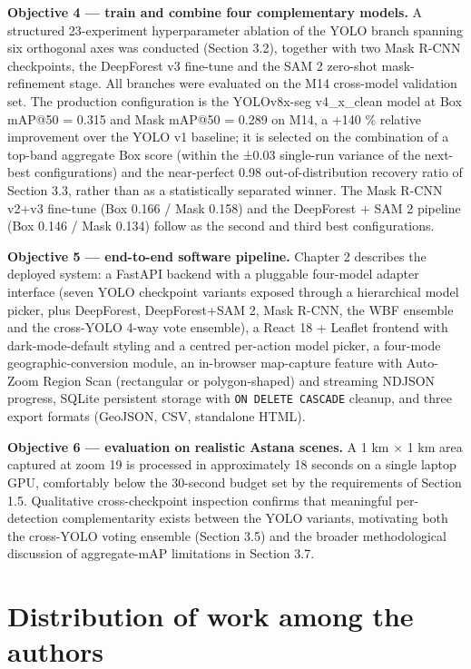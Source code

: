 \textbf{Objective 4 --- train and combine four complementary models.} A structured 23-experiment hyperparameter ablation of the YOLO branch spanning six orthogonal axes was conducted (Section 3.2), together with two Mask R-CNN checkpoints, the DeepForest v3 fine-tune and the SAM 2 zero-shot mask-refinement stage. All branches were evaluated on the M14 cross-model validation set. The production configuration is the YOLOv8x-seg v4\_x\_clean model at Box mAP@50 = 0.315 and Mask mAP@50 = 0.289 on M14, a +140 \% relative improvement over the YOLO v1 baseline; it is selected on the combination of a top-band aggregate Box score (within the ±0.03 single-run variance of the next-best configurations) and the near-perfect 0.98 out-of-distribution recovery ratio of Section 3.3, rather than as a statistically separated winner. The Mask R-CNN v2+v3 fine-tune (Box 0.166 / Mask 0.158) and the DeepForest + SAM 2 pipeline (Box 0.146 / Mask 0.134) follow as the second and third best configurations.

\textbf{Objective 5 --- end-to-end software pipeline.} Chapter 2 describes the deployed system: a FastAPI backend with a pluggable four-model adapter interface (seven YOLO checkpoint variants exposed through a hierarchical model picker, plus DeepForest, DeepForest+SAM 2, Mask R-CNN, the WBF ensemble and the cross-YOLO 4-way vote ensemble), a React 18 + Leaflet frontend with dark-mode-default styling and a centred per-action model picker, a four-mode geographic-conversion module, an in-browser map-capture feature with Auto-Zoom Region Scan (rectangular or polygon-shaped) and streaming NDJSON progress, SQLite persistent storage with \texttt{ON\ DELETE\ CASCADE} cleanup, and three export formats (GeoJSON, CSV, standalone HTML).

\textbf{Objective 6 --- evaluation on realistic Astana scenes.} A 1 km × 1 km area captured at zoom 19 is processed in approximately 18 seconds on a single laptop GPU, comfortably below the 30-second budget set by the requirements of Section 1.5. Qualitative cross-checkpoint inspection confirms that meaningful per-detection complementarity exists between the YOLO variants, motivating both the cross-YOLO voting ensemble (Section 3.5) and the broader methodological discussion of aggregate-mAP limitations in Section 3.7.

\section{Distribution of work among the authors}\label{distribution-of-work-among-the-authors}


